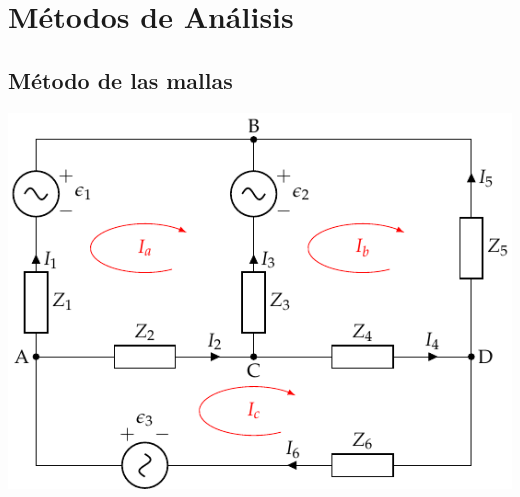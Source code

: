 \documentclass[aspectratio=169, usenames,svgnames,dvipsnames]{beamer}
\begin{document}
\section{Métodos de Análisis}
\label{sec:orga6e8344}

\subsection{Método de las mallas}
\label{sec:org86d2f9d}

\begin{frame}[label={sec:org8307bd7}]{}
\begin{center}
\includegraphics[height=0.95\textheight]{../figs/mallas_alterna.pdf}
\end{center}
\end{frame}
\end{document}

